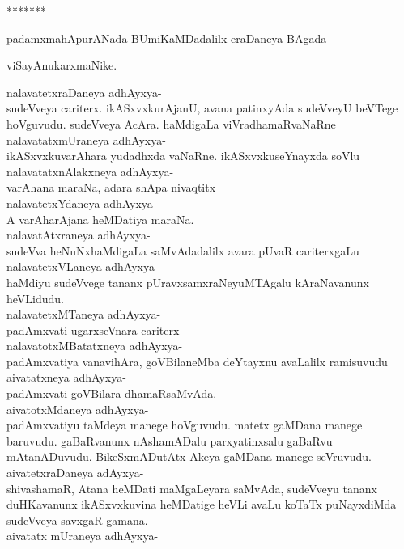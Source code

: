 \documentclass{article}
\begin{document}
\begin{center}
*******
\end{center}

\begin{center}
padamxmahApurANada BUmiKaMDadalilx eraDaneya BAgada
\end{center}
\begin{center}
viSayAnukarxmaNike.
\end{center}

nalavatetxraDaneya adhAyxya-\\
sudeVveya cariterx. ikASxvxkurAjanU, avana patinxyAda sudeVveyU beVTege hoVguvudu. sudeVveya AcAra. haMdigaLa viVradhamaRvaNaRne\\
nalavatatxmUraneya adhAyxya-\\
ikASxvxkuvarAhara yudadhxda vaNaRne. ikASxvxkuseYnayxda soVlu\\
nalavatatxnAlakxneya adhAyxya-\\
varAhana maraNa, adara shApa nivaqtitx\\
nalavatetxYdaneya adhAyxya-\\
A varAharAjana heMDatiya maraNa.\\
nalavatAtxraneya adhAyxya-\\
sudeVva heNuNxhaMdigaLa saMvAdadalilx avara pUvaR cariterxgaLu\\
nalavatetxVLaneya adhAyxya-\\
haMdiyu sudeVvege tananx pUravxsamxraNeyuMTAgalu kAraNavanunx heVLidudu.\\
nalavatetxMTaneya adhAyxya-\\
padAmxvati ugarxseVnara cariterx\\
nalavatotxMBatatxneya adhAyxya-\\
padAmxvatiya vanavihAra, goVBilaneMba deYtayxnu avaLalilx ramisuvudu\\
aivatatxneya adhAyxya-\\
padAmxvati goVBilara dhamaRsaMvAda.\\
aivatotxMdaneya adhAyxya-\\
padAmxvatiyu taMdeya manege hoVguvudu. matetx gaMDana manege baruvudu. gaBaRvanunx nAshamADalu parxyatinxsalu gaBaRvu mAtanADuvudu. BikeSxmADutAtx Akeya gaMDana manege seVruvudu.\\
aivatetxraDaneya adAyxya-\\
shivashamaR, Atana heMDati maMgaLeyara saMvAda, sudeVveyu tananx duHKavanunx ikASxvxkuvina heMDatige heVLi avaLu koTaTx puNayxdiMda sudeVveya savxgaR gamana.\\
aivatatx mUraneya adhAyxya-\\
\end{document}
